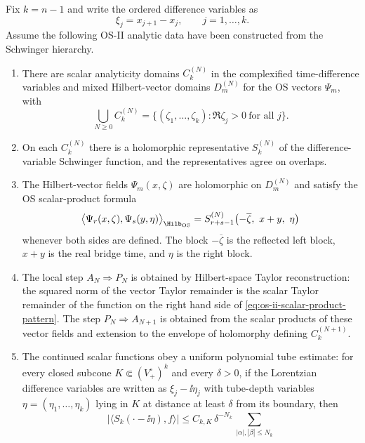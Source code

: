 \begin{proposition}
\label{prop:os-ii-analytic-route-to-boundary-package}
Fix \(k=n-1\) and write the ordered difference variables as
\[
  \xi_j=x_{j+1}-x_j,\qquad j=1,\ldots,k .
\]
Assume the following OS-II analytic data have been constructed from the
Schwinger hierarchy.
\begin{enumerate}[label=(\roman*)]
\item There are scalar analyticity domains \(C_k^{(N)}\) in the complexified
time-difference variables and mixed Hilbert-vector domains \(D_m^{(N)}\) for
the OS vectors \(\Psi_m\), with
\[
  \bigcup_{N\ge0} C_k^{(N)}
  =
  \{(\zeta_1,\ldots,\zeta_k):\Re\zeta_j>0\ \text{for all }j\}.
\]
\item On each \(C_k^{(N)}\) there is a holomorphic representative
\(S_k^{(N)}\) of the difference-variable Schwinger function, and the
representatives agree on overlaps.
\item The Hilbert-vector fields \(\Psi_m(x,\zeta)\) are holomorphic on
\(D_m^{(N)}\) and satisfy the OS scalar-product formula
\begin{equation}
  \bigl\langle
    \Psi_r(x,\zeta),\Psi_s(y,\eta)
  \bigr\rangle_{\Hilb_{\rm OS}}
  =
  S_{r+s-1}^{(N)}
  \bigl(-\overline\zeta,\ x+y,\ \eta\bigr)
  \label{eq:os-ii-scalar-product-pattern}
\end{equation}
whenever both sides are defined.  The block
\(-\overline\zeta\) is the reflected left block, \(x+y\) is the real bridge
time, and \(\eta\) is the right block.
\item The local step \(A_N\Rightarrow P_N\) is obtained by Hilbert-space
Taylor reconstruction: the squared norm of the vector Taylor remainder is the
scalar Taylor remainder of the function on the right hand side of
\eqref{eq:os-ii-scalar-product-pattern}.  The step \(P_N\Rightarrow A_{N+1}\)
is obtained from the scalar products of these vector fields and extension to
the envelope of holomorphy defining \(C_k^{(N+1)}\).
\item The continued scalar functions obey a uniform polynomial tube estimate:
for every closed subcone \(K\Subset(V_+^\circ)^k\) and every
\(\delta>0\), if the Lorentzian difference variables are written as
\(\xi_j-\ii\eta_j\) with tube-depth variables
\(\eta=(\eta_1,\ldots,\eta_k)\) lying in \(K\) at distance at least
\(\delta\) from its boundary, then
\begin{equation}
  |\langle S_k(\cdot-\ii\eta),f\rangle|
  \le
  C_{k,K}\,\delta^{-N_k}\,
  \sum_{|\alpha|,|\beta|\le N_k}

\end{equation}
\end{enumerate}
\end{proposition}
